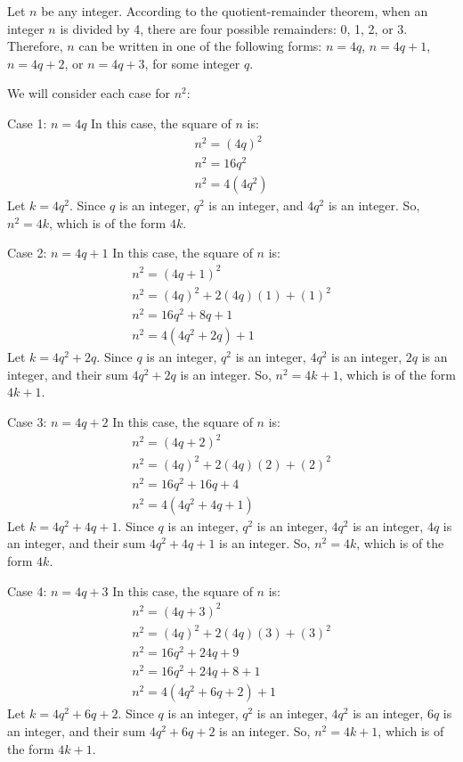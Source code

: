 \documentclass{article}
\begin{document}
Let $n$ be any integer.
According to the quotient-remainder theorem, when an integer $n$ is divided by 4, there are four possible remainders: 0, 1, 2, or 3.
Therefore, $n$ can be written in one of the following forms:
$n = 4q$, $n = 4q + 1$, $n = 4q + 2$, or $n = 4q + 3$, for some integer $q$.

We will consider each case for $n^2$:

Case 1: $n = 4q$
In this case, the square of $n$ is:
$$
\begin{array}{c}
n^2 = (4q)^2 \\
n^2 = 16q^2 \\
n^2 = 4(4q^2)
\end{array}
$$
Let $k = 4q^2$. Since $q$ is an integer, $q^2$ is an integer, and $4q^2$ is an integer.
So, $n^2 = 4k$, which is of the form $4k$.

Case 2: $n = 4q + 1$
In this case, the square of $n$ is:
$$
\begin{array}{c}
n^2 = (4q + 1)^2 \\
n^2 = (4q)^2 + 2(4q)(1) + (1)^2 \\
n^2 = 16q^2 + 8q + 1 \\
n^2 = 4(4q^2 + 2q) + 1
\end{array}
$$
Let $k = 4q^2 + 2q$. Since $q$ is an integer, $q^2$ is an integer, $4q^2$ is an integer, $2q$ is an integer, and their sum $4q^2 + 2q$ is an integer.
So, $n^2 = 4k + 1$, which is of the form $4k+1$.

Case 3: $n = 4q + 2$
In this case, the square of $n$ is:
$$
\begin{array}{c}
n^2 = (4q + 2)^2 \\
n^2 = (4q)^2 + 2(4q)(2) + (2)^2 \\
n^2 = 16q^2 + 16q + 4 \\
n^2 = 4(4q^2 + 4q + 1)
\end{array}
$$
Let $k = 4q^2 + 4q + 1$. Since $q$ is an integer, $q^2$ is an integer, $4q^2$ is an integer, $4q$ is an integer, and their sum $4q^2 + 4q + 1$ is an integer.
So, $n^2 = 4k$, which is of the form $4k$.

Case 4: $n = 4q + 3$
In this case, the square of $n$ is:
$$
\begin{array}{c}
n^2 = (4q + 3)^2 \\
n^2 = (4q)^2 + 2(4q)(3) + (3)^2 \\
n^2 = 16q^2 + 24q + 9 \\
n^2 = 16q^2 + 24q + 8 + 1 \\
n^2 = 4(4q^2 + 6q + 2) + 1
\end{array}
$$
Let $k = 4q^2 + 6q + 2$. Since $q$ is an integer, $q^2$ is an integer, $4q^2$ is an integer, $6q$ is an integer, and their sum $4q^2 + 6q + 2$ is an integer.
So, $n^2 = 4k + 1$, which is of the form $4k+1$.
\end{document}
